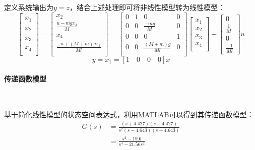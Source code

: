 \documentclass[UTF8]{article}
\begin{document}
定义系统输出为$y = z$，结合上述处理即可将非线性模型转为线性模型：
\begin{equation*}
	\begin{bmatrix}
		\dot{x}_1 \\
		\dot{x}_2 \\
		\dot{x}_3 \\
		\dot{x}_4 \\
	\end{bmatrix} = 
	\begin{bmatrix}
		x_2 \\
		\frac{u - mgx_3}{M} \\
		x_4 \\
		\frac{-u + (M + m)gx_3}{Ml} \\
	\end{bmatrix} = 
	\begin{bmatrix}
		0 & 1 & 0 & 0 \\
		0 & 0 & \frac{-mg}{M} & 0 \\
		0 & 0 & 0 & 1 \\
		0 & 0 & \frac{(M + m)g}{Ml} & 0 \\
	\end{bmatrix}
	\begin{bmatrix}
		x_1 \\
		x_2 \\
		x_3 \\
		x_4 \\
	\end{bmatrix} + 
	\begin{bmatrix}
		0 \\
		\frac{1}{M} \\
		0 \\
		\frac{-1}{Ml}
	\end{bmatrix}u
\end{equation*}
\begin{equation*}
	y = x_1 = [1 \quad 0 \quad 0 \quad 0]x
\end{equation*}

\paragraph{传递函数模型}~{}

基于简化线性模型的状态空间表达式，利用MATLAB可以得到其传递函数模型：
\begin{equation*}
	\begin{split}
		G(s) &= \frac{(s + 4.427)(s - 4.427)}{s^2(s - 4.643)(s + 4.643)} \\
		&= \frac{s^2 - 19.6}{s^4 - 21.56s^2} \\
	\end{split}
\end{equation*}
\end{document}
